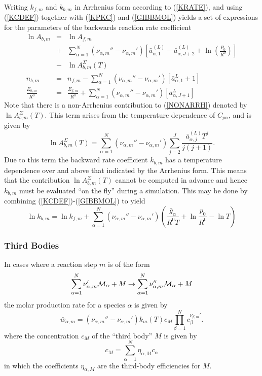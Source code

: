 \documentclass[dvips]{article}
\begin{document}
Writing $k_{f,m}$ and $k_{b,m}$ in Arrhenius form according to
(\ref{KRATE}), and using (\ref{KCDEF}) together with (\ref{KPKC}) and
(\ref{GIBBMOL}) yields a set of expressions for the parameters of the
backwards reaction rate coefficient
\begin{eqnarray}
\ln{A_{b,m}} & = & \ln{A_{f,m}}\nonumber \\
& + & \sum_{\alpha=1}^{N}(\nu_{\alpha,m}''-\nu_{\alpha,m}')
\left[
\bar{a}_{\alpha,1}^{(L)}-\bar{a}_{\alpha,J+2}^{(L)}
+\ln{\left(\frac{P_{0}}{R^{0}}\right)}
\right] \nonumber \\[2mm]
& - & \ln{A_{b,m}^{\Sigma}}(T) \label{NONARRH} \\
n_{b,m} & = & n_{f,m} 
-\sum_{\alpha=1}^{N}(\nu_{\alpha,m}''-\nu_{\alpha,m}')
\left[
\bar{a}_{\alpha,1}^{L}+1
\right] \\[2mm]
\frac{E_{b,m}}{R^{0}} & = &
\frac{E_{f,m}}{R^{0}} +
\sum_{\alpha=1}^{N}(\nu_{\alpha,m}''-\nu_{\alpha,m}')
\left[
\bar{a}_{\alpha,J+1}^{L}
\right]
\end{eqnarray}
Note that there is a non-Arrhenius contribution to (\ref{NONARRH}) denoted by
$\ln{A_{b,m}^{\Sigma}}(T)$.  This term arises 
from the temperature dependence of $C_{p\alpha}$, and is given by
\begin{equation}
\ln{A_{b,m}^{\Sigma}}(T) = 
\sum_{\alpha=1}^{N}(\nu_{\alpha,m}''-\nu_{\alpha,m}')
\sum_{j=2}^{J}\frac{\bar{a}_{\alpha,j}^{(L)}T^{j}}{j(j+1)}.
\end{equation}
Due to this term the backward rate coefficient $k_{b,m}$ has a temperature
dependence over and above that indicated by the Arrhenius form.  This
means that the contribution $\ln{A_{b,m}^{\Sigma}}(T)$ cannot be computed in
advance and hence $k_{b,m}$ must be evaluated ``on the fly'' during a
simulation.  This may be done by combining
(\ref{KCDEF})-(\ref{GIBBMOL}) to yield
\begin{equation}
\ln{k_{b,m}} = \ln{k_{f,m}}
+\sum_{\alpha=1}^{N}(\nu_{\alpha,m}''-\nu_{\alpha,m}')
\left(\frac{\bar{g}_{\alpha}}{R^{0}T}+\ln\frac{p_{0}}{R^{0}}-\ln{T}\right)
\label{GIBBSRATE}
\end{equation}

\subsubsection{Third Bodies}
In cases where a reaction step $m$ is of the form
\begin{equation}
\sum_{\alpha=1}^{N}\nu_{\alpha,m}'{\cal M}_{\alpha} + M \rightarrow
\sum_{\alpha=1}^{N}\nu_{\alpha,m}''{\cal M}_{\alpha} + M
\end{equation}
the molar production rate for a species $\alpha$ is given by
\begin{equation}
\bar{w}_{\alpha,m} = 
\left(\nu_{\alpha,m}''-\nu_{\alpha,m}'\right)k_{m}(T)
c_{M}\prod_{\beta=1}^{N}c_{\beta}^{\nu_{\beta,m}'}.
\label{THIRDSTEP}
\end{equation}
where the concentration $c_{M}$ of the ``third body'' $M$ is given by
\begin{equation}
c_{M} = \sum_{\alpha=1}^{N}\eta_{\alpha,M}c_{\alpha}
\label{THIRDEFFY}
\end{equation}
in which the coefficients $\eta_{\alpha,M}$ are the third-body efficiencies
for $M$.
\end{document}
